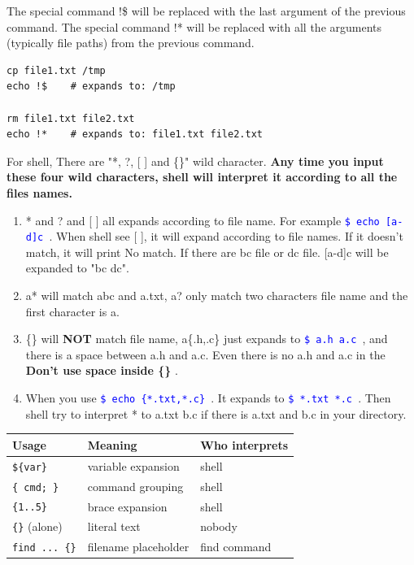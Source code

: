 \documentclass[paper=8.5in:11in, twoside, 12pt, pagesize=pdftex]{book}
\newcommand{\linuxcommand}[1]{\texttt{\textcolor{blue}{\$ #1 \Pisymbol{psy}{191}}}}
\begin{document}
The special command !\$ will be replaced with the last argument of the previous command. The special command !* will be replaced with all the arguments (typically file paths) from the previous command.

\begin{lstlisting}
cp file1.txt /tmp
echo !$    # expands to: /tmp

rm file1.txt file2.txt
echo !*    # expands to: file1.txt file2.txt
\end{lstlisting}

	For shell, There are "*, ?, [ ] and \{\}" wild character. \textbf{Any time you input these four wild characters, shell will interpret it according to all the files names.}
	
	\begin{enumerate}
		\item * and ? and [ ] all expands according to file name. For example \linuxcommand{echo [a-d]c}. When shell see [ ], it will expand according to file names. If it doesn't match, it will print No match. If there are bc file or dc file. [a-d]c will be expanded to "bc dc".
		
		\item a* will match abc and a.txt, a? only match two characters file name and the first character is a. 
		
		\item \{\} will \textbf{NOT} match file name, a\{.h,.c\} just expands to \linuxcommand{a.h a.c}, and there is a space between a.h and a.c. Even there is no a.h and a.c in the \textbf{Don't use space inside \{\} }.
		
		\item When you use \linuxcommand{echo \{*.txt,*.c\}}. It expands to \linuxcommand{*.txt *.c}. Then shell try to interpret * to a.txt b.c if there is a.txt and b.c in your directory.
	\end{enumerate}

\begin{tabular}{|l|l|l|}
\hline
\textbf{Usage} & \textbf{Meaning} & \textbf{Who interprets} \\
\hline
\texttt{\$\{var\}} & variable expansion & shell \\
\hline
\texttt{\{ cmd; \}} & command grouping & shell \\
\hline
\texttt{\{1..5\}} & brace expansion & shell \\
\hline
\texttt{\{\}} (alone) & literal text & nobody \\
\hline
\texttt{find ... \{\}} & filename placeholder & find command \\
\hline
\end{tabular}
\end{document}
